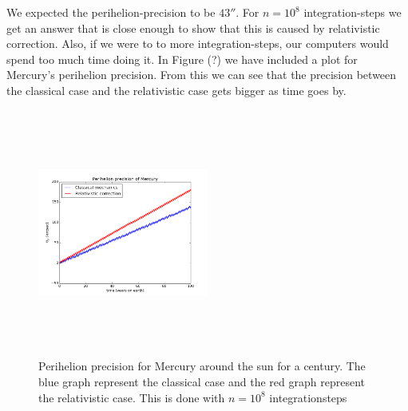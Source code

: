 \documentclass[%
 reprint,
 nobalance,
 amsmath,amssymb,
 aps,
]{revtex4-1}
\begin{document}
We expected the perihelion-precision to be $43''$. For $n=10^8$ integration-steps we get an answer that is close enough to show that this is caused by relativistic correction. Also, if we were to to more integration-steps, our computers would spend too much time doing it.
 In Figure (?) we have included a plot for Mercury's perihelion precision. From this we can see that the precision between the classical case and the relativistic case gets bigger as time goes by.
\begin{figure}[h]
\centering
\includegraphics[height=3.2in, width=0.5\textwidth]{plot/perihelion_precision.png} \caption{Perihelion precision for Mercury around the sun for a century. The blue graph represent the classical case and the red graph represent the relativistic case. This is done with $n=10^8$ integrationsteps}
\end{figure}








\end{document}
